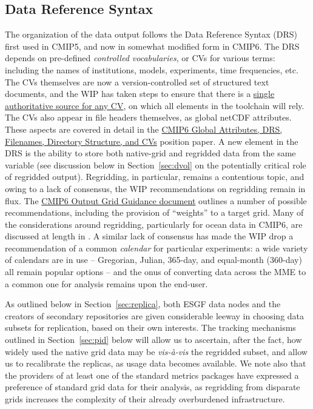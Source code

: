 \documentclass[gmd,manuscript]{copernicus}
\newcommand{\bibref}[1] { \cite{ref:#1}}
\newcommand{\secref}[1] {\mbox{Section  \ref{sec:#1}}}
\begin{document}
\subsection{Data Reference Syntax}
\label{sec:data-drs}

The organization of the data output follows the Data Reference Syntax
(DRS) first used in CMIP5, and now in somewhat modified form in CMIP6.
The DRS depends on pre-defined \emph{controlled vocabularies}, or CVs
for various terms: including the names of institutions, models,
experiments, time frequencies, etc. The CVs themselves are now a
version-controlled set of structured text documents, and the WIP has
taken steps to ensure that there is a
\href{https://goo.gl/HGafnJ}{single authoritative source for any CV},
on which all elements in the toolchain will rely. The CVs also appear
in file headers themselves, as global netCDF attributes. These aspects
are covered in detail in the \href{https://goo.gl/cMiPE7}{CMIP6 Global
  Attributes, DRS, Filenames, Directory Structure, and CVs} position
paper. A new element in the DRS is the ability to store both
native-grid and regridded data from the same variable (see discussion
below in \secref{dvol} on the potentially critical role of regridded
output). Regridding, in particular, remains a contentious topic, and
owing to a lack of consensus, the WIP recommendations on regridding
remain in flux. The \href{https://goo.gl/wVtm5t}{CMIP6 Output Grid
  Guidance document} outlines a number of possible recommendations,
including the provision of ``weights'' to a target grid. Many of the
considerations around regridding, particularly for ocean data in
CMIP6, are discussed at length in \bibref{griffiesetal2016}. A similar
lack of consensus has made the WIP drop a recommendation of a common
\emph{calendar} for particular experiments: a wide variety of
calendars are in use -- Gregorian, Julian, 365-day, and equal-month
(360-day) all remain popular options -- and the onus of converting
data across the MME to a common one for analysis remains upon the
end-user.

As outlined below in \secref{replica}, both ESGF data nodes and the
creators of secondary repositories are given considerable leeway in
choosing data subsets for replication, based on their own interests.
The tracking mechanisms outlined in \secref{pid} below will allow us
to ascertain, after the fact, how widely used the native grid data may
be \emph{vis-\`a-vis} the regridded subset, and allow us to
recalibrate the replicas, as usage data becomes available. We note
also that the providers of at least one of the standard metrics
packages \citep[ESMValTool,][]{ref:eyringetal2016a} have expressed a
preference of standard grid data for their analysis, as regridding
from disparate grids increases the complexity of their already
overburdened infrastructure.
\end{document}

